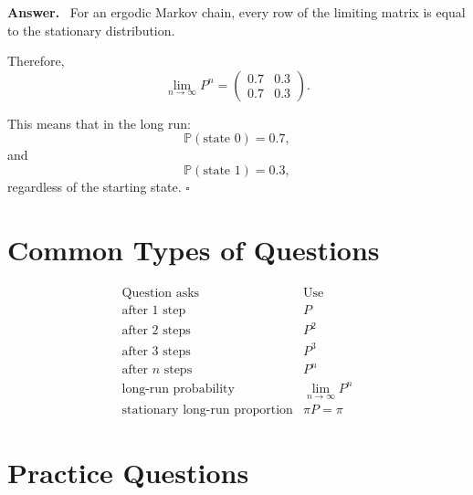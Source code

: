 \documentclass[12pt,a4paper]{article}
\theoremstyle{notestyle}
\newenvironment{answer}
{\par\textbf{Answer.}\ }
{\hfill$\square$\par}
\newcommand{\Prob}{\mathbb{P}}
\begin{document}
\begin{answer}
For an ergodic Markov chain, every row of the limiting matrix is equal to the stationary distribution.

Therefore,
\[
\lim_{n\to\infty}P^n
=
\begin{pmatrix}
0.7 & 0.3\\
0.7 & 0.3
\end{pmatrix}.
\]

This means that in the long run:
\[
\Prob(\text{state 0})=0.7,
\]
and
\[
\Prob(\text{state 1})=0.3,
\]
regardless of the starting state.
\end{answer}

\section{Common Types of Questions}

\[
\begin{array}{c|c}
\text{Question asks} & \text{Use}\\
\hline
\text{after 1 step} & P\\
\text{after 2 steps} & P^2\\
\text{after 3 steps} & P^3\\
\text{after }n\text{ steps} & P^n\\
\text{long-run probability} & \lim_{n\to\infty}P^n\\
\text{stationary long-run proportion} & \pi P=\pi
\end{array}
\]

\section{Practice Questions}
\end{document}
